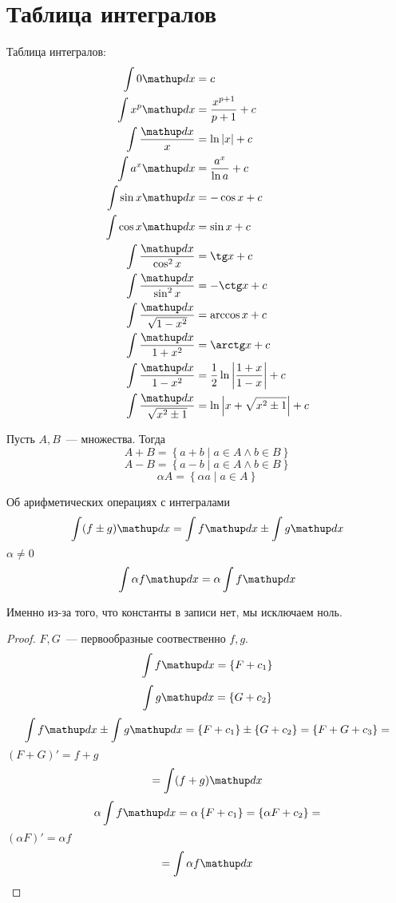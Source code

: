 ﻿\section{Таблица интегралов}

Таблица интегралов:
\begin{align*}
\int 0\d x &= c \\
\int x^p\d x &= \frac{x^{p+1}}{p + 1} + c \\
\int \frac{\d x}{x} &= \ln |x| + c \\
\int a^x \d x &= \frac{a^x}{\ln a} + c \\
\int \sin x \d x &= -\cos x + c \\
\int \cos x \d x &= \sin x + c \\
\int \frac{\d x}{\cos^2 x} &= \tg x + c \\
\int \frac{\d x}{\sin^2 x} &= -\ctg x + c \\
\int \frac{\d x}{\sqrt{1 - x^2}} &= \arccos x + c \\
\int \frac{\d x}{1 + x^2} &= \arctg x + c \\
\int \frac{\d x}{1 - x^2} &= \frac12 \ln \left|\frac{1+x}{1-x}\right| + c\\
\int \frac{\d x}{\sqrt{x^2 \pm 1}} &= \ln \left|x + \sqrt{x^2 \pm 1}\right| + c
\end{align*}

\begin{Def}
Пусть $A, B$~--- множества. Тогда
$$A + B = \left\{a + b \mid a \in A \land b \in B\right\}$$
$$A - B = \left\{a - b \mid a \in A \land b \in B\right\}$$
$$\alpha A = \left\{\alpha a \mid a \in A\right\}$$
\end{Def}

\begin{theorem}{Об арифметических операциях с интегралами}
$$\int (f \pm g) \d x = \int f \d x \pm \int g \d x$$
$\alpha \ne 0$
$$\int \alpha f \d x = \alpha \int f \d x$$
\end{theorem}
\begin{Rem}
Именно из-за того, что константы в записи нет, мы исключаем ноль.
\end{Rem}
\begin{proof}
$F, G$~--- первообразные соотвественно $f, g$.
$$\int f \d x = \left\{F + c_1\right\}$$
$$\int g \d x = \left\{G + c_2\right\}$$
$$\int f \d x \pm \int g \d x = \left\{F + c_1\right\} \pm \left\{G + c_2\right\} = \left\{F+G+c_3\right\} = $$
$(F+G)' = f + g$
$$ = \int (f+g)\d x$$
$$\alpha \int f \d x = \alpha \left\{F + c_1\right\} = \left\{\alpha F + c_2\right\} = $$
$(\alpha F)' = \alpha f$
$$ = \int \alpha f\d x$$
\end{proof}

